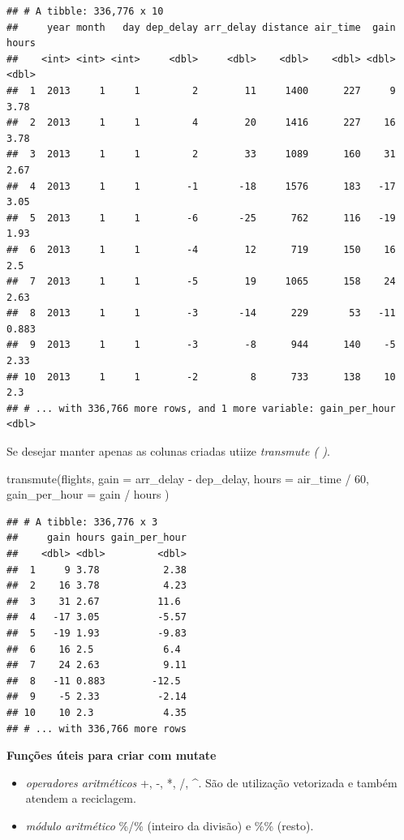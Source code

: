 \documentclass[
]{article}
\newenvironment{Shaded}{\begin{snugshade}}{\end{snugshade}}
\newcommand{\AttributeTok}[1]{\textcolor[rgb]{0.77,0.63,0.00}{#1}}
\newcommand{\DecValTok}[1]{\textcolor[rgb]{0.00,0.00,0.81}{#1}}
\newcommand{\FunctionTok}[1]{\textcolor[rgb]{0.00,0.00,0.00}{#1}}
\newcommand{\NormalTok}[1]{#1}
\newcommand{\SpecialCharTok}[1]{\textcolor[rgb]{0.00,0.00,0.00}{#1}}
\begin{document}
\begin{verbatim}
## # A tibble: 336,776 x 10
##     year month   day dep_delay arr_delay distance air_time  gain hours
##    <int> <int> <int>     <dbl>     <dbl>    <dbl>    <dbl> <dbl> <dbl>
##  1  2013     1     1         2        11     1400      227     9 3.78 
##  2  2013     1     1         4        20     1416      227    16 3.78 
##  3  2013     1     1         2        33     1089      160    31 2.67 
##  4  2013     1     1        -1       -18     1576      183   -17 3.05 
##  5  2013     1     1        -6       -25      762      116   -19 1.93 
##  6  2013     1     1        -4        12      719      150    16 2.5  
##  7  2013     1     1        -5        19     1065      158    24 2.63 
##  8  2013     1     1        -3       -14      229       53   -11 0.883
##  9  2013     1     1        -3        -8      944      140    -5 2.33 
## 10  2013     1     1        -2         8      733      138    10 2.3  
## # ... with 336,766 more rows, and 1 more variable: gain_per_hour <dbl>
\end{verbatim}

Se desejar manter apenas as colunas criadas utiize \emph{transmute ( )}.

\begin{Shaded}
\begin{Highlighting}[]
\FunctionTok{transmute}\NormalTok{(flights,}
  \AttributeTok{gain =}\NormalTok{ arr\_delay }\SpecialCharTok{{-}}\NormalTok{ dep\_delay,}
  \AttributeTok{hours =}\NormalTok{ air\_time }\SpecialCharTok{/} \DecValTok{60}\NormalTok{,}
  \AttributeTok{gain\_per\_hour =}\NormalTok{ gain }\SpecialCharTok{/}\NormalTok{ hours}
\NormalTok{)}
\end{Highlighting}
\end{Shaded}

\begin{verbatim}
## # A tibble: 336,776 x 3
##     gain hours gain_per_hour
##    <dbl> <dbl>         <dbl>
##  1     9 3.78           2.38
##  2    16 3.78           4.23
##  3    31 2.67          11.6 
##  4   -17 3.05          -5.57
##  5   -19 1.93          -9.83
##  6    16 2.5            6.4 
##  7    24 2.63           9.11
##  8   -11 0.883        -12.5 
##  9    -5 2.33          -2.14
## 10    10 2.3            4.35
## # ... with 336,766 more rows
\end{verbatim}

\textbf{Funções úteis para criar com mutate}

\begin{itemize}
\item
  \emph{operadores aritméticos} +, -, *, /, \^{}. São de utilização
  vetorizada e também atendem a reciclagem.
\item
  \emph{módulo aritmético} \%/\% (inteiro da divisão) e \%\% (resto).
\end{itemize}
\end{document}
